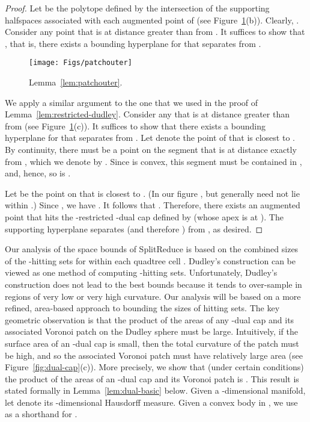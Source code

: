 \documentclass[11pt]{article}   \usepackage[letterpaper,hmargin=2.1cm,vmargin=3cm]{geometry}
\newcommand{\alg}{\textrm{SplitReduce}}
\begin{document}
\begin{proof}
Let  be the polytope defined by the intersection of the supporting halfspaces associated with each augmented point of  (see Figure~\ref{fig:patchouter}(b)). Clearly, . Consider any point  that is at distance greater than  from . It suffices to show that , that is, there exists a bounding hyperplane for  that separates  from . 

\begin{figure}[htbp]
  \centerline{\texttt{[image: Figs/patchouter]}}
  \caption{Lemma~\ref{lem:patchouter}.}
  \label{fig:patchouter}
\end{figure}


We apply a similar argument to the one that we used in the proof of Lemma~\ref{lem:restricted-dudley}. Consider any  that is at distance greater than  from  (see Figure~\ref{fig:patchouter}(c)). It suffices to show that there exists a bounding hyperplane for  that separates  from . Let  denote the point of  that is closest to . By continuity, there must be a point on the segment  that is at distance exactly  from , which we denote by . Since  is convex, this segment must be contained in , and, hence, so is . 

Let  be the point on  that is closest to . (In our figure , but generally  need not lie within .) Since , we have . It follows that . Therefore, there exists an augmented point  that hits the -restricted -dual cap defined by  (whose apex is at ). The supporting hyperplane  separates  (and therefore ) from , as desired.
\end{proof}


Our analysis of the space bounds of {\alg} is based on the combined sizes of the -hitting sets for  within each quadtree cell . Dudley's construction can be viewed as one method of computing -hitting sets. Unfortunately, Dudley's construction does not lead to the best bounds because it tends to over-sample in regions of very low or very high curvature. Our analysis will be based on a more refined, area-based approach to bounding the sizes of hitting sets. The key geometric observation is that the product of the areas of any -dual cap and its associated Voronoi patch on the Dudley sphere  must be large. Intuitively, if the surface area of an -dual cap is small, then the total curvature of the patch must be high, and so the associated Voronoi patch must have relatively large area (see Figure~\ref{fig:dual-cap}(c)). More precisely, we show that (under certain conditions) the product of the areas of an -dual cap and its Voronoi patch is . This result is stated formally in Lemma~\ref{lem:dual-basic} below. Given a -dimensional manifold, let  denote its -dimensional Hausdorff measure. Given a convex body  in , we use  as a shorthand for . 
\end{document}
